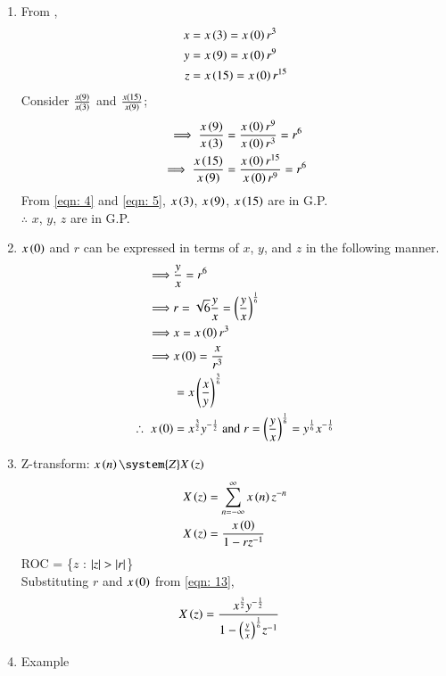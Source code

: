 \documentclass[journal,12pt,twocolumn]{IEEEtran}
\theoremstyle{remark}
\begin{document}
\begin{enumerate}
\item From ,
\begin{align}
    x&= x\left(3\right) =x\left(0\right)r^3 \\
 y&=x\left(9\right)=x\left(0\right)r^{9} \\
 z&=x\left(15\right)=x\left(0\right)r^{15}
\end{align}
Consider $\frac{x\left(9\right)}{x\left(3\right)}$ and $\frac{x\left(15\right)}{x\left(9\right)}$;
\begin{align}
 \implies\frac{x\left(9\right)}{x\left(3\right)} &= \frac{x\left(0\right)r^{9}}{x\left(0\right)r^3} = r^6 \label{eqn: 4}\\ 
 \implies\frac{x\left(15\right)}{x\left(9\right)} &= \frac{x\left(0\right)r^{15}}{x\left(0\right)r^{9}} = r^6\label{eqn: 5}
\end{align}
From \eqref{eqn: 4} and \eqref{eqn: 5}, $x\left(3\right)$, $x\left(9\right)$, $x\left(15\right)$ are in G.P.\\
$\therefore$  $x$, $y$, $z$ are in G.P.\\
\item
$x\left(0\right)$ and $r$ can be expressed in terms of $x$, $y$, and $z$ in the following manner.
\begin{align}
    \implies&\frac{y}{x}=r^6 \\
 \implies& r=\sqrt{6}{\frac{y}{x}}=\left(\frac{y}{x}\right)^{\frac{1}{6}}\\
    \implies&  x=x\left(0\right)r^3 \\
    \implies& x\left(0\right)=\frac{x}{r^3}\\
    &=x\left(\frac{x}{y}\right)^{\frac{3}{6}}\\
	\therefore\; x\left(0\right)&=x^{\frac{3}{2}}y^{-\frac{1}{2}}\;
 \text{and}\; r=\left(\frac{y}{x}\right)^{\frac{1}{6}}= y^{\frac{1}{6}}x^{-\frac{1}{6}} \label{eqn: 13}
\end{align}
\item 
Z-transform:    $x\brak{n} \system{Z} X\brak{z}$
\begin{align}
    X\left(z\right)&= \sum_{n=-\infty}^{\infty} x\left(n\right)z^{-n}\\
    X\left(z\right)&=\frac{x\left(0\right)}{1-rz^{-1}}
\end{align}
ROC = \{$z$ : $\left\vert z\right\vert>\left\vert r\right\vert$\}\\
Substituting $r$ and $x\left(0\right)$ from \eqref{eqn: 13}, 
\begin{align}
     X\left(z\right)&=\frac{x^{\frac{3}{2}}y^{-\frac{1}{2}}}{1-{\left(\frac{y}{x}\right)^{\frac{1}{6}}}z^{-1}}
\end{align}
\item Example 

\end{enumerate}
\end{document}
